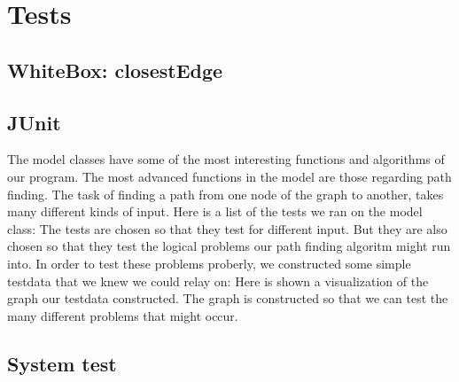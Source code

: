 \chapter{Tests}
\label{TEST}
\section{WhiteBox: closestEdge}
\label{TEST-CE}

\section{JUnit}
The model classes have some of the most interesting functions and algorithms of
our program. The most advanced functions in the model are those regarding path
finding. The task of finding a path from one node of the graph to another,
takes many different kinds of input. Here is a list of the tests we ran on the
model class:
The tests are chosen so that they test for different input. But they are also
chosen so that they test the logical problems our path finding algoritm might
run into. In order to test these problems proberly, we constructed some simple
testdata that we knew we could relay on:
Here is shown a
visualization of the graph our testdata constructed. The graph is constructed
so that we can test the many different problems that might occur.
\label{TEST-JU}

\section{System test}
\label{TEST-ST}